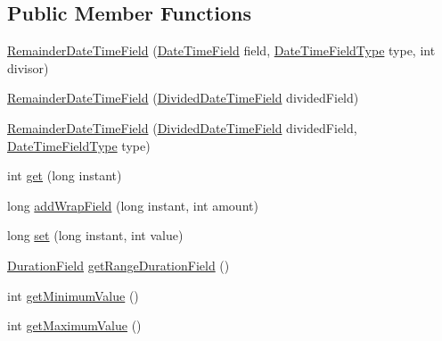 \subsection*{Public Member Functions}
\begin{DoxyCompactItemize}
\item 
\hyperlink{classorg_1_1joda_1_1time_1_1field_1_1_remainder_date_time_field_ade0d2e92fd533a1598008841c1dccb07}{Remainder\-Date\-Time\-Field} (\hyperlink{classorg_1_1joda_1_1time_1_1_date_time_field}{Date\-Time\-Field} field, \hyperlink{classorg_1_1joda_1_1time_1_1_date_time_field_type}{Date\-Time\-Field\-Type} type, int divisor)
\item 
\hyperlink{classorg_1_1joda_1_1time_1_1field_1_1_remainder_date_time_field_ad7cd0f331c7d992cf34efd52b540b73f}{Remainder\-Date\-Time\-Field} (\hyperlink{classorg_1_1joda_1_1time_1_1field_1_1_divided_date_time_field}{Divided\-Date\-Time\-Field} divided\-Field)
\item 
\hyperlink{classorg_1_1joda_1_1time_1_1field_1_1_remainder_date_time_field_aa85f9af623415fc8a122d320f4ea2a01}{Remainder\-Date\-Time\-Field} (\hyperlink{classorg_1_1joda_1_1time_1_1field_1_1_divided_date_time_field}{Divided\-Date\-Time\-Field} divided\-Field, \hyperlink{classorg_1_1joda_1_1time_1_1_date_time_field_type}{Date\-Time\-Field\-Type} type)
\item 
int \hyperlink{classorg_1_1joda_1_1time_1_1field_1_1_remainder_date_time_field_a9e2df35ca0d2b0206c179964258a4b4d}{get} (long instant)
\item 
long \hyperlink{classorg_1_1joda_1_1time_1_1field_1_1_remainder_date_time_field_a81a7f73a482a6e2ea9638380ed019bad}{add\-Wrap\-Field} (long instant, int amount)
\item 
long \hyperlink{classorg_1_1joda_1_1time_1_1field_1_1_remainder_date_time_field_ae850bdcf2a2682f30fea40eb87a8682e}{set} (long instant, int value)
\item 
\hyperlink{classorg_1_1joda_1_1time_1_1_duration_field}{Duration\-Field} \hyperlink{classorg_1_1joda_1_1time_1_1field_1_1_remainder_date_time_field_aef3b150b0244587431e7ea2bf10c4024}{get\-Range\-Duration\-Field} ()
\item 
int \hyperlink{classorg_1_1joda_1_1time_1_1field_1_1_remainder_date_time_field_aa198f33b6104e787e222956fc2e52d8c}{get\-Minimum\-Value} ()
\item 
int \hyperlink{classorg_1_1joda_1_1time_1_1field_1_1_remainder_date_time_field_a27778f559e6443db7a9dfa7e508448cb}{get\-Maximum\-Value} ()
\item 

\end{DoxyCompactItemize}

